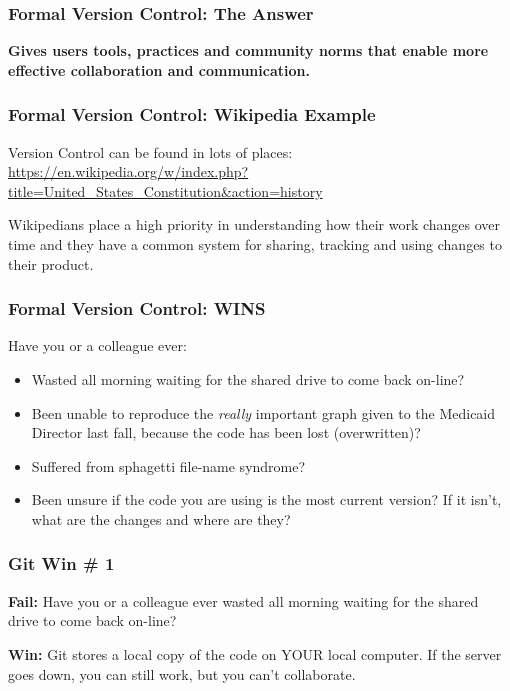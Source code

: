 \documentclass{beamer}
\begin{document}
\begin{frame} %
  \frametitle{Formal Version Control: The Answer}

  \textbf{Gives users tools, practices and community norms that enable
    more effective collaboration and communication.}
  
 \end{frame}
 
\begin{frame} %
  \frametitle{Formal Version Control: Wikipedia Example}

  Version Control can be found in lots of places:\\
  
  \smallskip
  {\tiny{\url{https://en.wikipedia.org/w/index.php?title=United\_States\_Constitution\&action=history}}}

  \bigskip
  Wikipedians place a high priority in understanding how their work
  changes over time and they have a common system for sharing,
  tracking and using changes to their product.

\end{frame}

\begin{frame}  %
  \frametitle{Formal Version Control: WINS}
  {\large Have you or a colleague ever:}
  \bigskip
  \begin{itemize}
  \item Wasted all morning waiting for the shared drive to come back
    on-line?
  \item Been unable to reproduce the \emph{really} important graph
    given to the Medicaid Director last fall, because the code has
    been lost (overwritten)?
  \item Suffered from sphagetti file-name syndrome?
  \item Been unsure if the code you are using is the most current
    version? If it isn't, what are the changes and where are they?
  \end{itemize}
\end{frame}

\begin{frame}
  \frametitle{Git Win \# 1} 
 
  \textbf{Fail:} Have you or a colleague ever wasted all morning
  waiting for the shared drive to come back on-line?
 
  \bigskip 

  \textbf{Win:} Git stores a local copy of the code on YOUR local
  computer. If the server goes down, you can still work, but you can't
  collaborate.
  
\end{frame}
 
\end{document}
